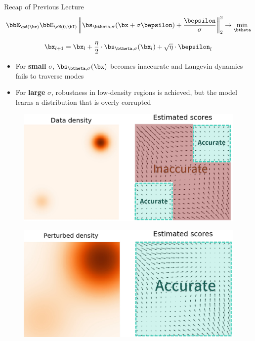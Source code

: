 \documentclass{beamer}
\begin{document}
\begin{frame}{Recap of Previous Lecture}
	\vspace{-0.5cm}
	\[
		\bbE_{\pd(\bx)} \bbE_{\cN(0, \bI)}\left\| \bs_{\btheta, \sigma}(\bx + \sigma \bepsilon) + \frac{\bepsilon}{\sigma} \right\|_2^2 \rightarrow \min_{\btheta}
	\]
	\begin{minipage}{0.5\linewidth}
		\[
			\bx_{l + 1} = \bx_l + \frac{\eta}{2} \cdot \bs_{\btheta, \sigma}(\bx_l) + \sqrt{\eta} \cdot \bepsilon_l
		\]
		\vspace{-0.3cm}
		\begin{itemize}
			\item For \textbf{small} $\sigma$, $\bs_{\btheta, \sigma}(\bx)$ becomes inaccurate and Langevin dynamics fails to traverse modes
			\item For \textbf{large} $\sigma$, robustness in low-density regions is achieved, but the model learns a distribution that is overly corrupted
		\end{itemize}
	\end{minipage}%
	\begin{minipage}{0.5\linewidth}
		\begin{figure}
			\includegraphics[width=\linewidth]{figs/pitfalls}
		\end{figure}
		\vspace{-0.3cm}
		\begin{figure}
			\includegraphics[width=\linewidth]{figs/single_noise}
		\end{figure}
	\end{minipage}
\end{frame}
\end{document}
